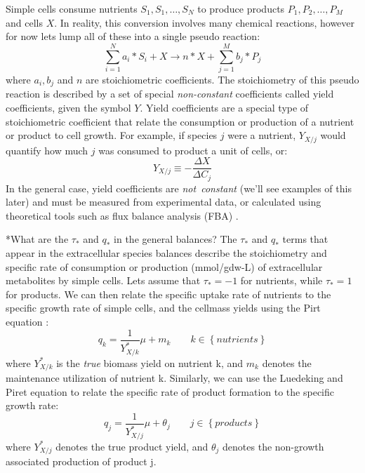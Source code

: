 \documentclass[11pt]{article}
\makeatletter
\theoremstyle{definition}
\renewcommand\subsubsection{\@startsection
	{subsubsection}{2}{0mm}
	{-0.05in}
	{-0.5\baselineskip}
	{\normalfont\normalsize\itshape}}
\makeatother
\begin{document}
\noindent Simple cells consume nutrients $S_{1},S_{1},\hdots,S_{N}$ to produce products $P_{1},P_{2},\hdots,P_{M}$ and cells $X$.
In reality, this conversion involves many chemical reactions, however for now lets lump all of these into a single pseudo reaction:
\begin{equation}\label{eqn-growth-rate}
\sum_{i=1}^{N}a_{i}*S_{i} + X \longrightarrow n*X + \sum_{j=1}^{M}b_{j}*P_{j}
\end{equation}where $a_{i},b_{j}$ and $n$ are stoichiometric coefficients.
The stoichiometry of this pseudo reaction is described by a set of special \emph{non-constant} coefficients called yield coefficients, given the symbol $Y$.
Yield coefficients are a special type of stoichiometric coefficient that relate the consumption or production of a nutrient or product to cell growth.
For example, if species $j$ were a nutrient, $Y_{X/j}$ would quantify how much $j$ was consumed to product a unit of cells, or:
\begin{equation}
	Y_{X/j} \equiv -\frac{\Delta X}{\Delta C_{j}}
\end{equation}
In the general case, yield coefficients are \textit{not~constant} (we'll see examples of this later) and must be measured from experimental data,
or calculated using theoretical tools such as flux balance analysis (FBA) \citep{Orth:2010uq}.

\subsubsection*{What are the $\tau_{*}$ and $q_{*}$ in the general balances?}
The $\tau_{*}$ and $q_{*}$ terms that appear in the extracellular species balances describe the stoichiometry and specific rate of consumption or production (mmol/gdw-L) of
extracellular metabolites by simple cells. Lets assume that $\tau_{*} = -1$ for nutrients, while $\tau_{*} = 1$ for products.
We can then relate the specific uptake rate of nutrients to the specific growth rate of simple cells, and the cellmass yields using the Pirt equation \citep{Pirt:1965aa}:
\begin{equation}
q_{k} = \frac{1}{Y^{*}_{X/k}}\mu+m_{k}\qquad{k\in\left\{nutrients\right\}}
\end{equation}where $Y^{*}_{X/k}$ is the \emph{true} biomass yield on nutrient k, and $m_{k}$ denotes the maintenance utilization of nutrient k. Similarly, we can use the
Luedeking and Piret equation \citep{Luedeking:2000aa} to relate the specific rate of product formation to the specific growth rate:
\begin{equation}
q_{j} = \frac{1}{Y^{*}_{X/j}}\mu+\theta_{j}\qquad{j\in\left\{products\right\}}
\end{equation}where $Y^{*}_{X/j}$ denotes the true product yield, and $\theta_{j}$ denotes the non-growth associated production of product j.


\end{document}
